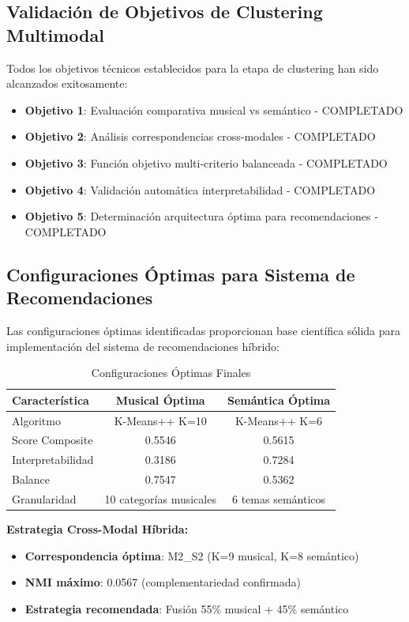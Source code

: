 \documentclass[12pt,a4paper]{article}
\begin{document}
\subsection{Validación de Objetivos de Clustering Multimodal}

Todos los objetivos técnicos establecidos para la etapa de clustering han sido alcanzados exitosamente:

\begin{itemize}
    \item[✓] \textbf{Objetivo 1}: Evaluación comparativa musical vs semántico - COMPLETADO
    \item[✓] \textbf{Objetivo 2}: Análisis correspondencias cross-modales - COMPLETADO
    \item[✓] \textbf{Objetivo 3}: Función objetivo multi-criterio balanceada - COMPLETADO
    \item[✓] \textbf{Objetivo 4}: Validación automática interpretabilidad - COMPLETADO
    \item[✓] \textbf{Objetivo 5}: Determinación arquitectura óptima para recomendaciones - COMPLETADO
\end{itemize}

\subsection{Configuraciones Óptimas para Sistema de Recomendaciones}

Las configuraciones óptimas identificadas proporcionan base científica sólida para implementación del sistema de recomendaciones híbrido:

\begin{table}[H]
\centering
\caption{Configuraciones Óptimas Finales}
\begin{tabular}{|l|c|c|}
\hline
\textbf{Característica} & \textbf{Musical Óptima} & \textbf{Semántica Óptima} \\
\hline
Algoritmo & K-Means++ K=10 & K-Means++ K=6 \\
\hline
Score Composite & 0.5546 & 0.5615 \\
\hline
Interpretabilidad & 0.3186 & 0.7284 \\
\hline
Balance & 0.7547 & 0.5362 \\
\hline
Granularidad & 10 categorías musicales & 6 temas semánticos \\
\hline
\end{tabular}
\end{table}

\textbf{Estrategia Cross-Modal Híbrida:}
\begin{itemize}
    \item \textbf{Correspondencia óptima}: M2\_S2 (K=9 musical, K=8 semántico)
    \item \textbf{NMI máximo}: 0.0567 (complementariedad confirmada)
    \item \textbf{Estrategia recomendada}: Fusión 55\% musical + 45\% semántico
\end{itemize}
\end{document}
